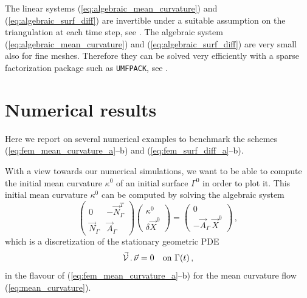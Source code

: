 The linear systems (\ref{eq:algebraic_mean_curvature}) and
(\ref{eq:algebraic_surf_diff}) are invertible under a suitable assumption on the
triangulation at each time step, see \cite{gflows3d}. The algebraic system
(\ref{eq:algebraic_mean_curvature}) and (\ref{eq:algebraic_surf_diff}) are
very small also for fine meshes. Therefore they can be solved very efficiently
with a sparse factorization package such as \verb|UMFPACK|, see \cite{Davis04}.

\section{Numerical results}\label{sec:geometric_pdes_results}
Here we report on several numerical examples to benchmark the schemes
(\ref{eq:fem_mean_curvature_a}--b) and (\ref{eq:fem_surf_diff_a}--b).

With a view towards our numerical simulations, we want to be able to compute
the initial mean curvature $\kappa^0$ of an initial surface $\Gamma^0$ in
order to plot it. This initial mean curvature $\kappa^0$ can be computed by
solving the algebraic system
\begin{equation}\label{eq:algebraic_initial_curvature}
\begin{pmatrix}
0 & -\vec N_\Gamma^{T} \\
\vec N_\Gamma & \vec A_\Gamma
\end{pmatrix}
\begin{pmatrix}
\kappa^0 \\
\delta \vec X^0
\end{pmatrix}
=
\begin{pmatrix}
0 \\
- \vec A_\Gamma \, \vec X^0
\end{pmatrix}
\,,
\end{equation}
which is a discretization of the stationary geometric PDE
\begin{equation}
\vec{\mathcal{V}}\,.\,\vec\nu=0\quad\mbox{on }\Gamma(t)\,,
\end{equation}
in the flavour of (\ref{eq:fem_mean_curvature_a}--b) for the mean curvature
flow (\ref{eq:mean_curvature}).


